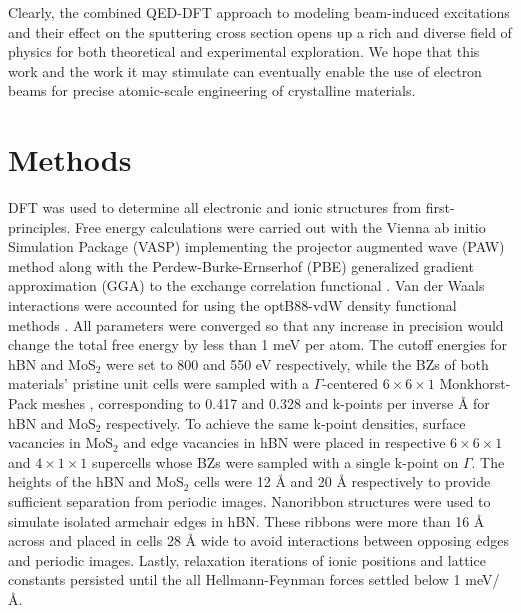 \documentclass{article}
\begin{document}
Clearly, the combined QED-DFT approach to modeling beam-induced excitations and
their effect on the sputtering cross section opens up a rich and diverse field
of physics for both theoretical and experimental exploration.
We hope that this work and the work it may stimulate can eventually enable the
use of electron beams for precise atomic-scale engineering of crystalline
materials.

\section{Methods}
\label{sec:methods}

DFT \cite{Hohenberg1964, Kohn1965} was used to determine all electronic and
ionic structures from first-principles.
Free energy calculations were carried out with the Vienna ab initio Simulation
Package (VASP) \cite{Kresse1996, Kresse1996a} implementing the projector
augmented wave (PAW) method \cite{Blochl1994} along with the
Perdew-Burke-Ernserhof (PBE) generalized gradient approximation (GGA) to the
exchange correlation functional \cite{Perdew1996}.
Van der Waals interactions were accounted for using the optB88-vdW density
functional methods \cite{Klimes2010, Klimes2011}.
All parameters were converged so that any increase in precision would change
the total free energy by less than 1 meV per atom.
The cutoff energies for hBN and MoS$_2$ were set to 800 and 550 eV
respectively, while the BZs of both materials' pristine unit cells were sampled
with a $\Gamma$-centered $6\times6\times1$ Monkhorst-Pack meshes
\cite{Monkhorst1976}, corresponding to 0.417 and 0.328 and k-points per inverse
{\AA} for hBN and MoS$_2$ respectively.
To achieve the same k-point densities, surface vacancies in MoS$_2$ and edge
vacancies in hBN were placed in respective $6\times6\times1$ and
$4\times1\times1$ supercells whose BZs were sampled with a single k-point on
$\Gamma$.
The heights of the hBN and MoS$_2$ cells were 12 {\AA} and 20 {\AA}
respectively to provide sufficient separation from periodic images.
Nanoribbon structures were used to simulate isolated armchair edges in hBN.
These ribbons were more than 16 {\AA} across and placed in cells 28 {\AA} wide
to avoid interactions between opposing edges and periodic images.
Lastly, relaxation iterations of ionic positions and lattice constants
persisted until the all Hellmann-Feynman forces settled below 1 
meV/{\AA}.
\end{document}
